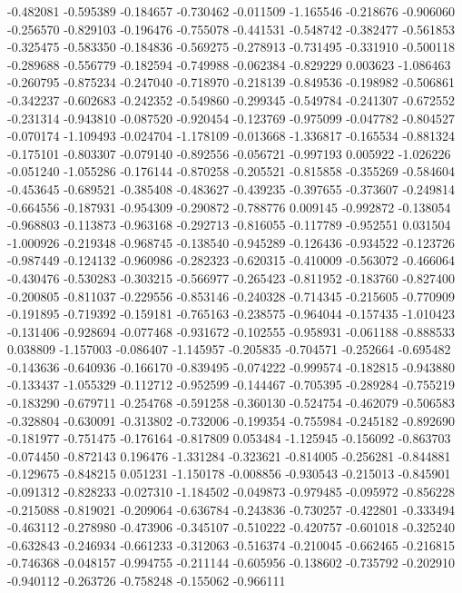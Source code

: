 -0.482081
-0.595389
-0.184657
-0.730462
-0.011509
-1.165546
-0.218676
-0.906060
-0.256570
-0.829103
-0.196476
-0.755078
-0.441531
-0.548742
-0.382477
-0.561853
-0.325475
-0.583350
-0.184836
-0.569275
-0.278913
-0.731495
-0.331910
-0.500118
-0.289688
-0.556779
-0.182594
-0.749988
-0.062384
-0.829229
0.003623
-1.086463
-0.260795
-0.875234
-0.247040
-0.718970
-0.218139
-0.849536
-0.198982
-0.506861
-0.342237
-0.602683
-0.242352
-0.549860
-0.299345
-0.549784
-0.241307
-0.672552
-0.231314
-0.943810
-0.087520
-0.920454
-0.123769
-0.975099
-0.047782
-0.804527
-0.070174
-1.109493
-0.024704
-1.178109
-0.013668
-1.336817
-0.165534
-0.881324
-0.175101
-0.803307
-0.079140
-0.892556
-0.056721
-0.997193
0.005922
-1.026226
-0.051240
-1.055286
-0.176144
-0.870258
-0.205521
-0.815858
-0.355269
-0.584604
-0.453645
-0.689521
-0.385408
-0.483627
-0.439235
-0.397655
-0.373607
-0.249814
-0.664556
-0.187931
-0.954309
-0.290872
-0.788776
0.009145
-0.992872
-0.138054
-0.968803
-0.113873
-0.963168
-0.292713
-0.816055
-0.117789
-0.952551
0.031504
-1.000926
-0.219348
-0.968745
-0.138540
-0.945289
-0.126436
-0.934522
-0.123726
-0.987449
-0.124132
-0.960986
-0.282323
-0.620315
-0.410009
-0.563072
-0.466064
-0.430476
-0.530283
-0.303215
-0.566977
-0.265423
-0.811952
-0.183760
-0.827400
-0.200805
-0.811037
-0.229556
-0.853146
-0.240328
-0.714345
-0.215605
-0.770909
-0.191895
-0.719392
-0.159181
-0.765163
-0.238575
-0.964044
-0.157435
-1.010423
-0.131406
-0.928694
-0.077468
-0.931672
-0.102555
-0.958931
-0.061188
-0.888533
0.038809
-1.157003
-0.086407
-1.145957
-0.205835
-0.704571
-0.252664
-0.695482
-0.143636
-0.640936
-0.166170
-0.839495
-0.074222
-0.999574
-0.182815
-0.943880
-0.133437
-1.055329
-0.112712
-0.952599
-0.144467
-0.705395
-0.289284
-0.755219
-0.183290
-0.679711
-0.254768
-0.591258
-0.360130
-0.524754
-0.462079
-0.506583
-0.328804
-0.630091
-0.313802
-0.732006
-0.199354
-0.755984
-0.245182
-0.892690
-0.181977
-0.751475
-0.176164
-0.817809
0.053484
-1.125945
-0.156092
-0.863703
-0.074450
-0.872143
0.196476
-1.331284
-0.323621
-0.814005
-0.256281
-0.844881
-0.129675
-0.848215
0.051231
-1.150178
-0.008856
-0.930543
-0.215013
-0.845901
-0.091312
-0.828233
-0.027310
-1.184502
-0.049873
-0.979485
-0.095972
-0.856228
-0.215088
-0.819021
-0.209064
-0.636784
-0.243836
-0.730257
-0.422801
-0.333494
-0.463112
-0.278980
-0.473906
-0.345107
-0.510222
-0.420757
-0.601018
-0.325240
-0.632843
-0.246934
-0.661233
-0.312063
-0.516374
-0.210045
-0.662465
-0.216815
-0.746368
-0.048157
-0.994755
-0.211144
-0.605956
-0.138602
-0.735792
-0.202910
-0.940112
-0.263726
-0.758248
-0.155062
-0.966111
